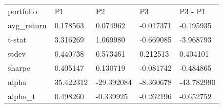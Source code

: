 \begin{tabular}{lllll}
\toprule
\midrule
portfolio & P1 & P2 & P3 & P3 - P1 \\
avg_return & 0.178563 & 0.074962 & -0.017371 & -0.195935 \\
t-stat & 3.316269 & 1.069980 & -0.669085 & -3.968793 \\
stdev & 0.440738 & 0.573461 & 0.212513 & 0.404101 \\
sharpe & 0.405147 & 0.130719 & -0.081742 & -0.484865 \\
alpha & 35.422312 & -29.392084 & -8.360678 & -43.782990 \\
alpha_t & 0.498260 & -0.339925 & -0.262196 & -0.652752 \\
\bottomrule
\end{tabular}
